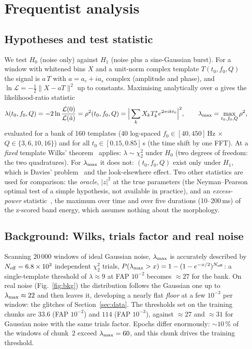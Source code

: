 \section{Frequentist analysis}\label{sec:freq}

\subsection{Hypotheses and test statistic}
We test $H_0$ (noise only) against $H_1$ (noise plus a sine-Gaussian burst). For a window with whitened bins $X$ and a unit-norm complex template $T(t_0,f_0,Q)$ the signal is $a\,T$ with $a=a_c+ia_s$ complex (amplitude and phase),
and $\ln\mathcal L=-\tfrac12\|X-aT\|^2$ up to constants. Maximising analytically over $a$ gives the likelihood-ratio statistic
\begin{equation}
\lambda(t_0,f_0,Q)=-2\ln\frac{\mathcal L(0)}{\mathcal L(\hat a)}=\rho^2(t_0,f_0,Q)=\Big|\sum_kX_kT_k^*e^{2\pi ikt_0}\Big|^2 ,\qquad
\lambda_{\max}=\max_{t_0,f_0,Q}\rho^2 ,
\end{equation}
evaluated for a bank of 160 templates (40 log-spaced $f_0\in[40,450]$\,Hz $\times$ $Q\in\{3,6,10,16\}$) and for all $t_0\in[0.15,0.85]$\,s (the time shift by one FFT).
At a \emph{fixed} template Wilks' theorem~\cite{Wilks} applies: $\lambda\sim\chi^2_2$ under $H_0$ (two degrees of freedom: the two quadratures). For $\lambda_{\max}$ it does not: $(t_0,f_0,Q)$ exist only under $H_1$, which is Davies' problem~\cite{Davies} and the
look-elsewhere effect. Two other statistics are used for comparison: the \emph{oracle}, $|z|^2$ at the true parameters (the Neyman--Pearson optimal test of a simple hypothesis, not available in practice), and an
\emph{excess-power} statistic~\cite{ExcessPower}, the maximum over time and over five durations (10--200\,ms) of the z-scored band energy, which assumes nothing about the morphology.

\subsection{Background: Wilks, trials factor and real noise}
Scanning $20\,000$ windows of ideal Gaussian noise, $\lambda_{\max}$ is accurately described by $N_{\rm eff}=6.8\times10^3$ independent $\chi^2_2$ trials, $P(\lambda_{\max}>x)=1-(1-e^{-x/2})^{N_{\rm eff}}$:
a single-template threshold of $\lambda\approx9$ at FAP $10^{-2}$ becomes $\approx27$ for the bank. On real noise (Fig.~\ref{fig:bkg}) the distribution follows the Gaussian one up to $\lambda_{\max}\approx22$ and then leaves it, developing a nearly flat \emph{floor} at
a few $10^{-3}$ per window: the glitches of Section~\ref{sec:data}. The thresholds set on the training chunks are $33.6$ (FAP $10^{-2}$) and $114$ (FAP $10^{-3}$), against $\approx27$ and $\approx31$ for Gaussian noise
with the same trials factor. Epochs differ enormously: $\sim10\,\%$ of the windows of chunk~2 exceed $\lambda_{\max}=60$, and this chunk drives the training threshold.

